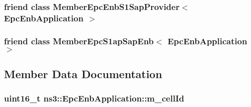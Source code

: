\subsubsection[{\texorpdfstring{Member\+Epc\+Enb\+S1\+Sap\+Provider$<$ Epc\+Enb\+Application $>$}{MemberEpcEnbS1SapProvider< EpcEnbApplication >}}]{\setlength{\rightskip}{0pt plus 5cm}friend class {\bf Member\+Epc\+Enb\+S1\+Sap\+Provider}$<$ {\bf Epc\+Enb\+Application} $>$\hspace{0.3cm}{\ttfamily [friend]}}\hypertarget{classns3_1_1EpcEnbApplication_a9c8ee96d88de199cb8efc646b3fbb575}{}\label{classns3_1_1EpcEnbApplication_a9c8ee96d88de199cb8efc646b3fbb575}
\subsubsection[{\texorpdfstring{Member\+Epc\+S1ap\+Sap\+Enb$<$ Epc\+Enb\+Application $>$}{MemberEpcS1apSapEnb< EpcEnbApplication >}}]{\setlength{\rightskip}{0pt plus 5cm}friend class {\bf Member\+Epc\+S1ap\+Sap\+Enb}$<$ {\bf Epc\+Enb\+Application} $>$\hspace{0.3cm}{\ttfamily [friend]}}\hypertarget{classns3_1_1EpcEnbApplication_abe1d5bf2a67020078bfd864c8324a173}{}\label{classns3_1_1EpcEnbApplication_abe1d5bf2a67020078bfd864c8324a173}


\subsection{Member Data Documentation}
\subsubsection[{\texorpdfstring{m\+\_\+cell\+Id}{m_cellId}}]{\setlength{\rightskip}{0pt plus 5cm}uint16\+\_\+t ns3\+::\+Epc\+Enb\+Application\+::m\+\_\+cell\+Id\hspace{0.3cm}{\ttfamily [private]}}\hypertarget{classns3_1_1EpcEnbApplication_a77c5a697bc069ae78c8fbc5b781f43b5}{}\label{classns3_1_1EpcEnbApplication_a77c5a697bc069ae78c8fbc5b781f43b5}

